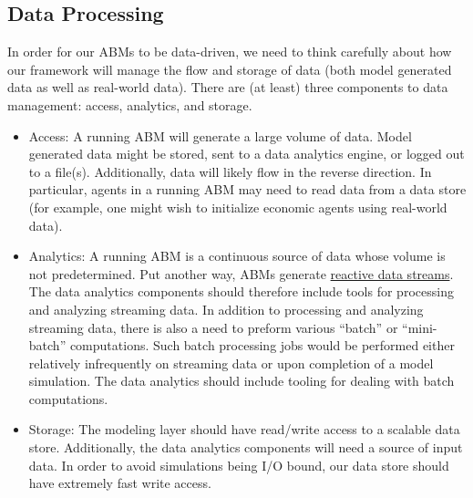 \documentclass[a4paper]{article}
\begin{document}
  
\subsection{Data Processing}

In order for our ABMs to be data-driven, we need to think carefully about how our framework will manage the flow and storage of data (both model generated data as well as real-world data). There are (at least) three components to data management: access, analytics, and storage.
\begin{itemize}
    \item Access: A running ABM will generate a large volume of data. Model generated data might be stored, sent to a data analytics engine, or logged out to a file(s). Additionally, data will likely flow in the reverse direction.  In particular, agents in a running ABM may need to read data from a data store (for example, one might wish to initialize economic agents using real-world data).
    \item Analytics: A running ABM is a continuous source of data whose volume is not predetermined. Put another way, ABMs generate \href{http://www.reactive-streams.org/}{reactive data streams}.  The data analytics components should therefore include tools for processing and analyzing streaming data. In addition to processing and analyzing streaming data, there is also a need to preform various ``batch'' or ``mini-batch'' computations. Such batch processing jobs would be performed either relatively infrequently on streaming data or upon completion of a model simulation. The data analytics should include tooling for dealing with batch computations.
    \item Storage: The modeling layer should have read/write access to a scalable data store. Additionally, the data analytics components will need a source of input data. In order to avoid simulations being I/O bound, our data store should have extremely fast write access.
\end{itemize}
\end{document}
